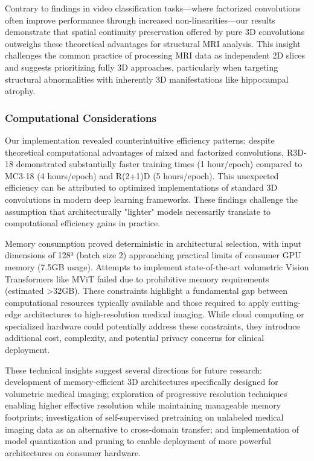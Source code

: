 \documentclass[12pt, a4paper]{article}
\begin{document}
Contrary to findings in video classification tasks—where factorized convolutions often improve performance through increased non-linearities—our results demonstrate that spatial continuity preservation offered by pure 3D convolutions outweighs these theoretical advantages for structural MRI analysis. This insight challenges the common practice of processing MRI data as independent 2D slices and suggests prioritizing fully 3D approaches, particularly when targeting structural abnormalities with inherently 3D manifestations like hippocampal atrophy.

\subsubsection{Computational Considerations}

Our implementation revealed counterintuitive efficiency patterns: despite theoretical computational advantages of mixed and factorized convolutions, R3D-18 demonstrated substantially faster training times (1 hour/epoch) compared to MC3-18 (4 hours/epoch) and R(2+1)D (5 hours/epoch). This unexpected efficiency can be attributed to optimized implementations of standard 3D convolutions in modern deep learning frameworks. These findings challenge the assumption that architecturally "lighter" models necessarily translate to computational efficiency gains in practice.

Memory consumption proved deterministic in architectural selection, with input dimensions of 128³ (batch size 2) approaching practical limits of consumer GPU memory (7.5GB usage). Attempts to implement state-of-the-art volumetric Vision Transformers like MViT failed due to prohibitive memory requirements (estimated >32GB). These constraints highlight a fundamental gap between computational resources typically available and those required to apply cutting-edge architectures to high-resolution medical imaging. While cloud computing or specialized hardware could potentially address these constraints, they introduce additional cost, complexity, and potential privacy concerns for clinical deployment.

These technical insights suggest several directions for future research: development of memory-efficient 3D architectures specifically designed for volumetric medical imaging; exploration of progressive resolution techniques enabling higher effective resolution while maintaining manageable memory footprints; investigation of self-supervised pretraining on unlabeled medical imaging data as an alternative to cross-domain transfer; and implementation of model quantization and pruning to enable deployment of more powerful architectures on consumer hardware.
\end{document}
